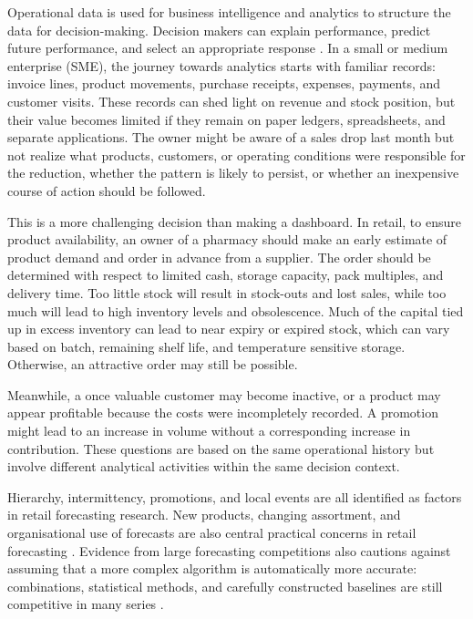 \documentclass[a4paper,11pt,oneside]{book}
\theoremstyle{plain}
\theoremstyle{definition}
\theoremstyle{remark}
\begin{document}
Operational data is used for business intelligence and analytics to structure the data for decision-making. Decision makers can explain performance, predict future performance, and select an appropriate response \cite{chen2012business}. In a small or medium enterprise (SME), the journey towards analytics starts with familiar records: invoice lines, product movements, purchase receipts, expenses, payments, and customer visits. These records can shed light on revenue and stock position, but their value becomes limited if they remain on paper ledgers, spreadsheets, and separate applications. The owner might be aware of a sales drop last month but not realize what products, customers, or operating conditions were responsible for the reduction, whether the pattern is likely to persist, or whether an inexpensive course of action should be followed.

This is a more challenging decision than making a dashboard. In retail, to ensure product availability, an owner of a pharmacy should make an early estimate of product demand and order in advance from a supplier. The order should be determined with respect to limited cash, storage capacity, pack multiples, and delivery time. Too little stock will result in stock-outs and lost sales, while too much will lead to high inventory levels and obsolescence. Much of the capital tied up in excess inventory can lead to near expiry or expired stock, which can vary based on batch, remaining shelf life, and temperature sensitive storage. Otherwise, an attractive order may still be possible.

Meanwhile, a once valuable customer may become inactive, or a product may appear profitable because the costs were incompletely recorded. A promotion might lead to an increase in volume without a corresponding increase in contribution. These questions are based on the same operational history but involve different analytical activities within the same decision context.

Hierarchy, intermittency, promotions, and local events are all identified as factors in retail forecasting research. New products, changing assortment, and organisational use of forecasts are also central practical concerns in retail forecasting \cite{fildes2022retail}. Evidence from large forecasting competitions also cautions against assuming that a more complex algorithm is automatically more accurate: combinations, statistical methods, and carefully constructed baselines are still competitive in many series \cite{makridakis2022m5}.
\end{document}
